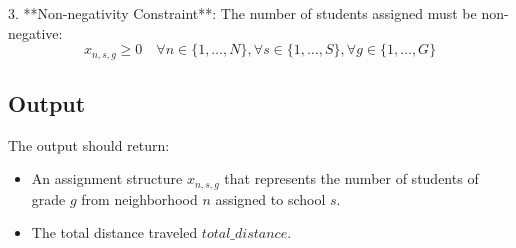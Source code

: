 \documentclass{article}
\begin{document}
3. **Non-negativity Constraint**: The number of students assigned must be non-negative:
\[
x_{n,s,g} \geq 0 \quad \forall n \in \{1, \ldots, N\}, \forall s \in \{1, \ldots, S\}, \forall g \in \{1, \ldots, G\}
\]

\subsection*{Output}
The output should return:
\begin{itemize}
    \item An assignment structure \( x_{n,s,g} \) that represents the number of students of grade \( g \) from neighborhood \( n \) assigned to school \( s \).
    \item The total distance traveled \( total\_distance \).
\end{itemize}
\end{document}
